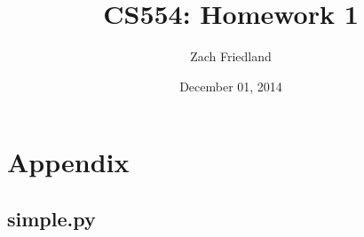 \documentclass[10pt,letterpaper,final,titlepage]{article}
\title{CS554: Homework 1}
\author{Zach Friedland}
\date{December 01, 2014}
\begin{document}
\maketitle

\newpage
\section*{Appendix}

\subsection*{simple.py}

\end{document}
